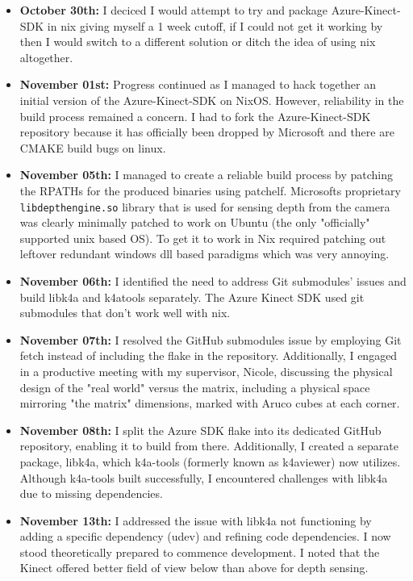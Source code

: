 \begin{itemize}
    \item \textbf{October 30th:} I deciced I would attempt to try and package Azure-Kinect-SDK in nix giving myself a 1 week cutoff, if I could not get it working by then I would switch to a different solution or ditch the idea of using nix altogether.

    \item \textbf{November 01st:} Progress continued as I managed to hack together an initial version of the Azure-Kinect-SDK on NixOS. However, reliability in the build process remained a concern. I had to fork the Azure-Kinect-SDK repository because it has officially been dropped by Microsoft and there are CMAKE build bugs on linux.

    \item \textbf{November 05th:} I managed to create a reliable build process by patching the RPATHs for the produced binaries using patchelf. Microsofts proprietary \texttt{libdepthengine.so} library that is used for sensing depth from the camera was clearly minimally patched to work on Ubuntu (the only "officially" supported unix based OS). To get it to work in Nix required patching out leftover redundant windows dll based paradigms which was very annoying. 

    \item \textbf{November 06th:} I identified the need to address Git submodules' issues and build libk4a and k4atools separately. The Azure Kinect SDK used git submodules that don't work well with nix.

    \item \textbf{November 07th:} I resolved the GitHub submodules issue by employing Git fetch instead of including the flake in the repository. Additionally, I engaged in a productive meeting with my supervisor, Nicole, discussing the physical design of the "real world" versus the matrix, including a physical space mirroring "the matrix" dimensions, marked with Aruco cubes at each corner.

    \item \textbf{November 08th:} I split the Azure SDK flake into its dedicated GitHub repository, enabling it to build from there. Additionally, I created a separate package, libk4a, which k4a-tools (formerly known as k4aviewer) now utilizes. Although k4a-tools built successfully, I encountered challenges with libk4a due to missing dependencies.

    \item \textbf{November 13th:} I addressed the issue with libk4a not functioning by adding a specific dependency (udev) and refining code dependencies. I now stood theoretically prepared to commence development. I noted that the Kinect offered better field of view below than above for depth sensing.


\end{itemize}
